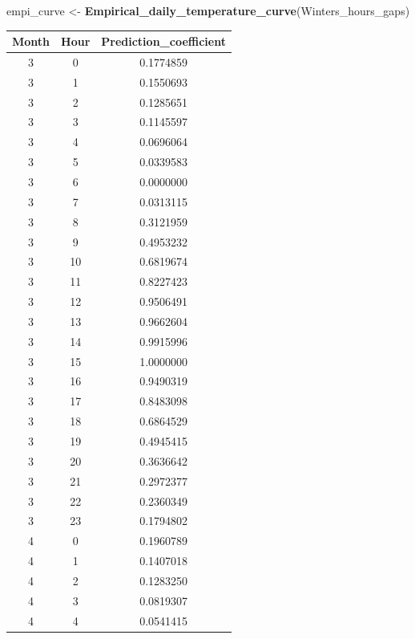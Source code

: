 \documentclass[
]{article}
\newenvironment{Shaded}{\begin{snugshade}}{\end{snugshade}}
\newcommand{\FunctionTok}[1]{\textcolor[rgb]{0.13,0.29,0.53}{\textbf{#1}}}
\newcommand{\NormalTok}[1]{#1}
\newcommand{\OtherTok}[1]{\textcolor[rgb]{0.56,0.35,0.01}{#1}}
\begin{document}
\begin{Shaded}
\begin{Highlighting}[]
\NormalTok{empi\_curve }\OtherTok{\textless{}{-}} \FunctionTok{Empirical\_daily\_temperature\_curve}\NormalTok{(Winters\_hours\_gaps)}
\end{Highlighting}
\end{Shaded}

\begin{table}
\centering\begingroup\fontsize{15}{17}\selectfont

\begin{tabular}{c|c|c}
\hline
Month & Hour & Prediction\_coefficient\\
\hline
3 & 0 & 0.1774859\\
\hline
3 & 1 & 0.1550693\\
\hline
3 & 2 & 0.1285651\\
\hline
3 & 3 & 0.1145597\\
\hline
3 & 4 & 0.0696064\\
\hline
3 & 5 & 0.0339583\\
\hline
3 & 6 & 0.0000000\\
\hline
3 & 7 & 0.0313115\\
\hline
3 & 8 & 0.3121959\\
\hline
3 & 9 & 0.4953232\\
\hline
3 & 10 & 0.6819674\\
\hline
3 & 11 & 0.8227423\\
\hline
3 & 12 & 0.9506491\\
\hline
3 & 13 & 0.9662604\\
\hline
3 & 14 & 0.9915996\\
\hline
3 & 15 & 1.0000000\\
\hline
3 & 16 & 0.9490319\\
\hline
3 & 17 & 0.8483098\\
\hline
3 & 18 & 0.6864529\\
\hline
3 & 19 & 0.4945415\\
\hline
3 & 20 & 0.3636642\\
\hline
3 & 21 & 0.2972377\\
\hline
3 & 22 & 0.2360349\\
\hline
3 & 23 & 0.1794802\\
\hline
4 & 0 & 0.1960789\\
\hline
4 & 1 & 0.1407018\\
\hline
4 & 2 & 0.1283250\\
\hline
4 & 3 & 0.0819307\\
\hline
4 & 4 & 0.0541415\\

\end{tabular}
\end{table}
\end{document}
